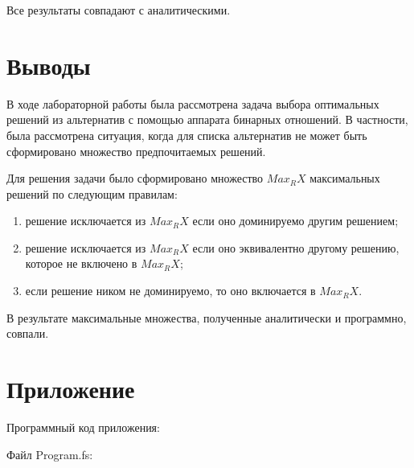 \documentclass[a4paper,14pt]{extarticle}
\begin{document}
Все результаты совпадают с аналитическими.

\section*{Выводы}

В ходе лабораторной работы была рассмотрена задача выбора оптимальных решений из
альтернатив с помощью аппарата бинарных отношений. В частности, была рассмотрена
ситуация, когда для списка альтернатив не может быть сформировано множество
предпочитаемых решений.

Для решения задачи было сформировано множество $Max_R X$ максимальных решений по
следующим правилам:

\begin{enumerate}
    \item решение исключается из $Max_R X$ если оно доминируемо другим решением;
    \item решение исключается из $Max_R X$ если оно эквивалентно другому решению, которое не включено в $Max_R X$;
    \item если решение ником не доминируемо, то оно включается в $Max_R X$.
\end{enumerate}

В результате максимальные множества, полученные аналитически и программно, совпали.

\newpage

\section*{Приложение}
Программный код приложения:

Файл Program.fs:
\end{document}
